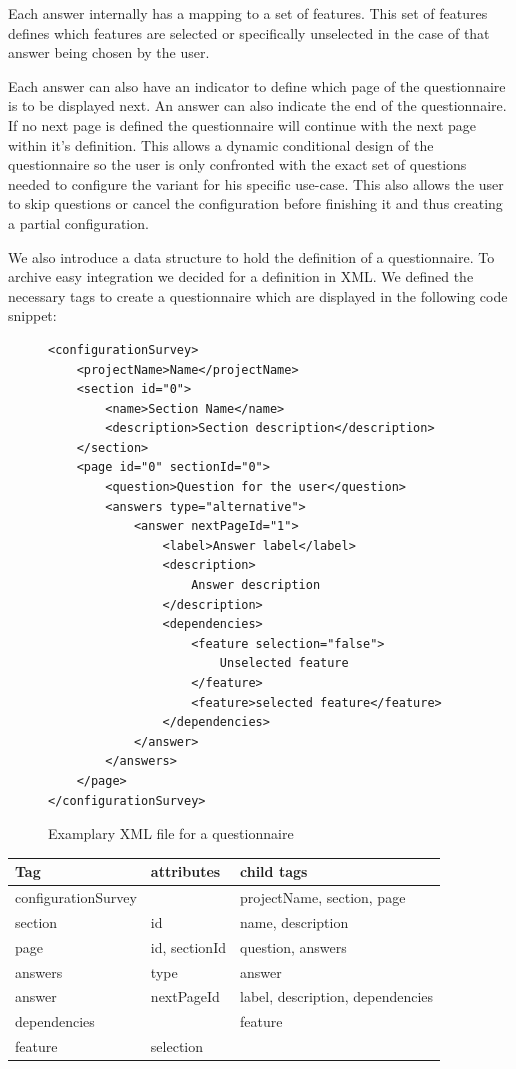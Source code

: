 Each answer internally has a mapping to a set of features. This set of features defines which features are selected or specifically unselected in the case of that answer being chosen by the user.

Each answer can also have an indicator to define which page of the questionnaire is to be displayed next. An answer can also indicate the end of the questionnaire. If no next page is defined the questionnaire will continue with the next page within it's definition. This allows a dynamic conditional design of the questionnaire so the user is only confronted with the exact set of questions needed to configure the variant for his specific use-case. This also allows the user to skip questions or cancel the configuration before finishing it and thus creating a partial configuration.

We also introduce a data structure to hold the definition of a questionnaire. To archive easy integration we decided for a definition in XML. We defined the necessary tags to create a questionnaire which are displayed in the following code snippet:

\begin{figure}
\lstset{language=XML}
\begin{lstlisting}
<configurationSurvey>
	<projectName>Name</projectName>
	<section id="0">
		<name>Section Name</name>
		<description>Section description</description>
	</section>
	<page id="0" sectionId="0">
		<question>Question for the user</question>
		<answers type="alternative">
			<answer nextPageId="1">
				<label>Answer label</label>
				<description>
					Answer description
				</description>
				<dependencies>
					<feature selection="false">
						Unselected feature
					</feature>
					<feature>selected feature</feature>
				</dependencies>
			</answer>
		</answers>
	</page>
</configurationSurvey>
\end{lstlisting}
\caption{Examplary XML file for a  questionnaire}
\end{figure}

\begin{tabulary}{\linewidth}{LLL}
\textbf{Tag} & \textbf{attributes} & \textbf{child tags}\\
\hline
configurationSurvey & & projectName, section, page\\
section & id & name, description\\
page & id, sectionId & question, answers\\
answers & type & answer\\
answer & nextPageId & label, description, dependencies\\
dependencies & & feature\\
feature & selection & \\
\end{tabulary}\vspace{2.5em}

